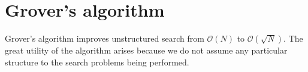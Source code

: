 \chapter{Grover's algorithm}
Grover's algorithm improves unstructured search from $\mathcal{O}(N)$ to $\mathcal{O}(\sqrt{N})$. The great utility of the  algorithm arises because we do not assume any particular structure to the search problems being performed.




